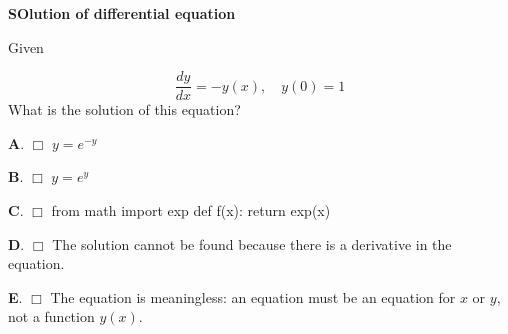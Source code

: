 \documentclass[%
oneside,                 %
final,                   %
10pt]{article}
\newenvironment{doconcequiz}{}{}
\newcounter{doconcequizcounter}
\newenvironment{doconceexercise}{}{}
\newcounter{doconceexercisecounter}
\theoremstyle{definition}
\begin{document}
\begin{enumerate}
\begin{doconceexercise}
\edat


\end{doconceexercise}

\begin{doconceexercise}

                             
\label{sec:this:exer:de}


\begin{doconcequiz}
\label{quiz:diff:eq1}


\noindent\textbf{\large SOlution of differential equation}

\noindent
Given

\[ \frac{dy}{dx} = -y(x),\quad y(0)=1 \]
What is the solution of this equation?

\vspace{2mm}

\textbf{A}. $\Box$ 
$y=e^{-y}$

\textbf{B}. $\Box$ 
$y=e^{y}$

\textbf{C}. $\Box$ 
\bpycod
from math import exp
def f(x):
    return exp(x)

\epycod

\textbf{D}. $\Box$ 
The solution cannot be found because there is a derivative in the equation.

\textbf{E}. $\Box$ 
The equation is meaningless: an equation must be an equation
for $x$ or $y$, not a function $y(x)$.



\vspace{3mm}

\end{doconcequiz}



\end{doconceexercise}

\begin{doconceexercise}

                             



\end{doconceexercise}
\end{enumerate}
\end{document}
